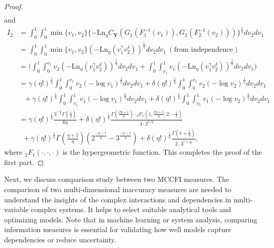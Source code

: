 \documentclass[12pt, a4paper]{article}
\numberwithin{equation}{section}
\begin{document}
\begin{proof}
\begin{align}
\end{align}
and 
\begin{align*}
I_2&= \int_{0}^{1}\int_{0}^{1}\min\{v_1,v_2\}\{-\mathrm{Ln}_\eta C_{\textbf{Y}}(G_1(F_1^{-1}(v_1)),G_2(F_2^{-1}(v_2)))\}^{\frac{1}{\eta}}dv_2dv_1\nonumber\\
&=\int_{0}^{1}\int_{0}^{1} \min\{v_1,v_2\}(-\mathrm{Ln}_\eta(v_1^\gamma v_2^\delta))^{\frac{1}{\eta}}dv_2dv_1 ~(\mbox{from~independence})\nonumber\\
&=\bigg(\int_{0}^{1}\int_{0}^{v_1}v_2(-\mathrm{Ln}_\eta(v_1^\gamma v_2^\delta))^{\frac{1}{\eta}}dv_2dv_1+\int_{0}^{1}\int_{v_1}^{1}v_1(-\mathrm{Ln}_\eta(v_1^\gamma v_2^\delta))^{\frac{1}{\eta}}dv_2dv_1\bigg)\nonumber\\
&=\gamma(\eta!)^{\frac{1}{\eta}}\int_0^1\int_0^{v_1}v_2(-\log v_1)^{\frac{1}{\eta}}dv_2dv_1+\delta(\eta!)^{\frac{1}{\eta}}\int_0^1\int_0^{v_1}v_2(-\log v_2)^{\frac{1}{\eta}}dv_2dv_1\nonumber\\
&~~~+\gamma(\eta!)^{\frac{1}{\eta}}\int_0^1\int_{v_1}^1 v_1(-\log v_1)^{\frac{1}{\eta}}dv_2dv_1+\delta(\eta!)^{\frac{1}{\eta}}\int_0^1\int_{v_1}^1 v_1(-\log v_2)^{\frac{1}{\eta}}dv_2dv_1\nonumber\\
&=\gamma(\eta!)^{\frac{1}{\eta}}\frac{3^{-\frac{1}{\eta}}\Gamma(\frac{1}{\eta})}{6\eta}+\delta(\eta!)^{\frac{1}{\eta}}
\frac{\Gamma\left(\frac{2\eta + 1}{\eta}\right) \cdot {}_{2}F_{1}\left(1, \frac{2\eta + 1}{\eta}; 2; -\frac{1}{2} \right)}{4 \cdot 2^{1/\eta}}\nonumber\\
&~~+\gamma(\eta!)^{\frac{1}{\eta}}\Gamma\left(\frac{\eta+1}{\eta}\right)\left(2^{\frac{-\eta-1}{\eta}}-3^{\frac{-\eta-1}{\eta}}\right)+\delta(\eta!)^{\frac{1}{\eta}}\frac{\Gamma\left(1+\frac{1}{\eta}\right)}{2\cdot3^{1+\frac{1}{\eta}}},
\end{align*}
where ${}_{2}F_{1}(\cdot,\cdot,\cdot)$ is the hypergeometric function.
This completes the proof of the first part. 
\end{proof}
 Next, we discuss comparison study between two MCCFI measures. The comparison of two multi-dimensional inaccuracy measures are needed to understand the insights of the complex interactions and dependencies in multi-variable complex systems. It helps to select suitable analytical tools and optimizing models. Note that in machine learning or system analysis, comparing information measures is essential for validating how well models capture dependencies or reduce uncertainty.
\end{document}
